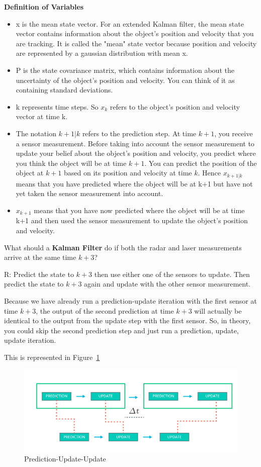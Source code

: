 \documentclass[11pt, a4paper]{article}
\begin{document}
\textbf{Definition of Variables}
\begin{itemize}
	\item x is the mean state vector. For an extended Kalman filter, the mean state vector contains information about the object's position and velocity that you are tracking. It is called the "mean" state vector because position and velocity are represented by a gaussian distribution with mean x.
	\item P is the state covariance matrix, which contains information about the uncertainty of the object's position and velocity. You can think of it as containing standard deviations.
	\item k represents time steps. So $x_k$ refers to the object's position and velocity vector at time k.
	\item The notation $k+1|k$ refers to the prediction step. At time $k+1$, you receive a sensor measurement. Before taking into account the sensor measurement to update your belief about the object's position and velocity, you predict where you think the object will be at time $k+1$. You can predict the position of the object at $k+1$ based on its position and velocity at time $k$. Hence $x_{k+1|k}$  means that you have predicted where the object will be at k+1 but have not yet taken the sensor measurement into account.
	\item $x_{k+1}$ means that you have now predicted where the object will be at time k+1 and then used the sensor measurement to update the object's position and velocity.

\end{itemize}




What should a \textbf{Kalman Filter} do if both the radar and laser measurements arrive at the same time \textbf{$k+3$}?

R: Predict the state to $k+3$ then use either one of the sensors to update. Then predict the state to $k+3$ again and update with the other sensor measurement.


Because we have already run a prediction-update iteration with the first sensor at time $k+3$, the output of the second prediction at time $k+3$ will actually be identical to the output from the update step with the first sensor. So, in theory, you could skip the second prediction step and just run a prediction, update, update iteration.

This is represented in Figure~\ref{fig:2-sensors-quiz}

\begin{figure}[htpb!]
	\centering
	\includegraphics[width=0.8\linewidth]{2-sensors-quiz}
	\caption{Prediction-Update-Update}
	\label{fig:2-sensors-quiz}
\end{figure}
\end{document}
